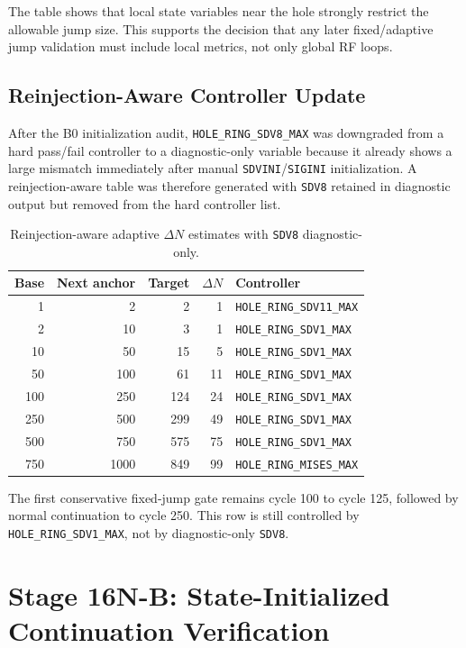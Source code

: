 \documentclass[11pt,a4paper]{article}
\newcommand{\code}[1]{\texttt{#1}}
\begin{document}
The table shows that local state variables near the hole strongly restrict the allowable jump size. This supports the decision that any later fixed/adaptive jump validation must include local metrics, not only global RF loops.

\subsection{Reinjection-Aware Controller Update}

After the B0 initialization audit, \code{HOLE\_RING\_SDV8\_MAX} was downgraded from a hard pass/fail controller to a diagnostic-only variable because it already shows a large mismatch immediately after manual \code{SDVINI}/\code{SIGINI} initialization. A reinjection-aware table was therefore generated with \code{SDV8} retained in diagnostic output but removed from the hard controller list.

\begin{table}[H]
\centering
\caption{Reinjection-aware adaptive $\Delta N$ estimates with \code{SDV8} diagnostic-only.}
\begin{tabular}{rrrrl}
\toprule
Base & Next anchor & Target & $\Delta N$ & Controller \\
\midrule
1 & 2 & 2 & 1 & \code{HOLE\_RING\_SDV11\_MAX} \\
2 & 10 & 3 & 1 & \code{HOLE\_RING\_SDV1\_MAX} \\
10 & 50 & 15 & 5 & \code{HOLE\_RING\_SDV1\_MAX} \\
50 & 100 & 61 & 11 & \code{HOLE\_RING\_SDV1\_MAX} \\
100 & 250 & 124 & 24 & \code{HOLE\_RING\_SDV1\_MAX} \\
250 & 500 & 299 & 49 & \code{HOLE\_RING\_SDV1\_MAX} \\
500 & 750 & 575 & 75 & \code{HOLE\_RING\_SDV1\_MAX} \\
750 & 1000 & 849 & 99 & \code{HOLE\_RING\_MISES\_MAX} \\
\bottomrule
\end{tabular}
\end{table}

The first conservative fixed-jump gate remains cycle 100 to cycle 125, followed by normal continuation to cycle 250. This row is still controlled by \code{HOLE\_RING\_SDV1\_MAX}, not by diagnostic-only \code{SDV8}.

\section{Stage 16N-B: State-Initialized Continuation Verification}
\end{document}

